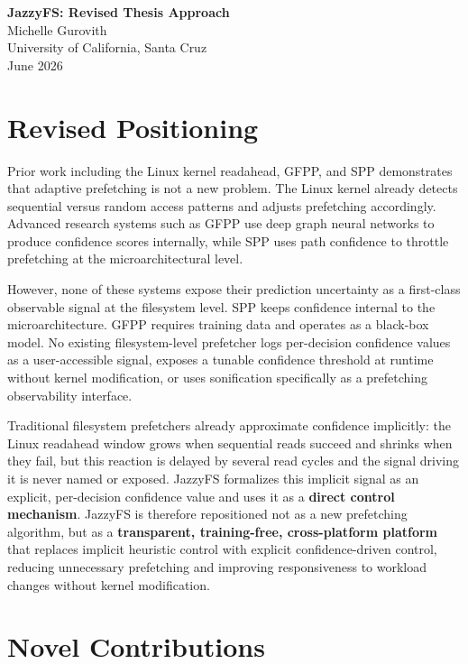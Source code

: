 \documentclass[12pt]{article}
\begin{document}
\begin{center}
{\large \textbf{JazzyFS: Revised Thesis Approach}}\\[0.2in]
{\normalsize Michelle Gurovith\\
University of California, Santa Cruz\\
June 2026}
\end{center}

\section*{Revised Positioning}

Prior work including the Linux kernel readahead, GFPP, and SPP demonstrates
that adaptive prefetching is not a new problem. The Linux kernel already detects
sequential versus random access patterns and adjusts prefetching accordingly.
Advanced research systems such as GFPP use deep graph neural networks to
produce confidence scores internally, while SPP uses path confidence to throttle
prefetching at the microarchitectural level.

However, none of these systems expose their prediction uncertainty as a
first-class observable signal at the filesystem level. SPP keeps confidence
internal to the microarchitecture. GFPP requires training data and operates
as a black-box model. No existing filesystem-level prefetcher logs
per-decision confidence values as a user-accessible signal, exposes a
tunable confidence threshold at runtime without kernel modification, or
uses sonification specifically as a prefetching observability interface.

Traditional filesystem prefetchers already approximate confidence implicitly:
the Linux readahead window grows when sequential reads succeed and shrinks when
they fail, but this reaction is delayed by several read cycles and the signal
driving it is never named or exposed. JazzyFS formalizes this implicit signal as
an explicit, per-decision confidence value and uses it as a \textbf{direct
control mechanism}. JazzyFS is therefore repositioned not as a new prefetching
algorithm, but as a \textbf{transparent, training-free, cross-platform platform}
that replaces implicit heuristic control with explicit confidence-driven control,
reducing unnecessary prefetching and improving responsiveness to workload changes
without kernel modification.

\section*{Novel Contributions}
\end{document}
